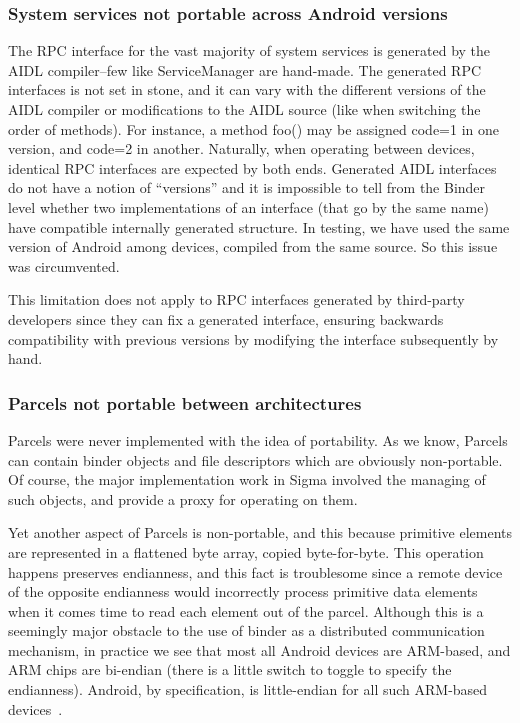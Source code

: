 \documentclass[prodmode]{acmlarge}
\begin{document}
\subsubsection{System services not portable across Android versions}
The RPC interface for the vast majority of system services is generated by the AIDL compiler--few like ServiceManager are hand-made. The generated RPC interfaces is not set in stone, and it can vary with the different versions of the AIDL compiler or modifications to the AIDL source (like when switching the order of methods). For instance, a method foo() may be assigned code=1 in one version, and code=2 in another. Naturally, when operating between devices, identical RPC interfaces are expected by both ends. Generated AIDL interfaces do not have a notion of ``versions'' and it is impossible to tell from the Binder level whether two implementations of an interface (that go by the same name) have compatible internally generated structure. In testing, we have used the same version of Android among devices, compiled from the same source. So this issue was circumvented.

This limitation does not apply to RPC interfaces generated by third-party developers since they can fix a generated interface, ensuring backwards compatibility with previous versions by modifying the interface subsequently by hand.

\subsubsection{Parcels not portable between architectures}
Parcels were never implemented with the idea of portability. As we know, Parcels can contain binder objects and file descriptors which are obviously non-portable. Of course, the major implementation work in Sigma involved the managing of such objects, and provide a proxy for operating on them.

Yet another aspect of Parcels is non-portable, and this because primitive elements are represented in a flattened byte array, copied byte-for-byte. This operation happens preserves endianness, and this fact is troublesome since a remote device of the opposite endianness would incorrectly process primitive data elements when it comes time to read each element out of the parcel. Although this is a seemingly major obstacle to the use of binder as a distributed communication mechanism, in practice we see that most all Android devices are ARM-based, and ARM chips are bi-endian (there is a little switch to toggle to specify the endianness). Android, by specification, is little-endian for all such ARM-based devices~\cite{ARMLittleEndian}.
\end{document}
